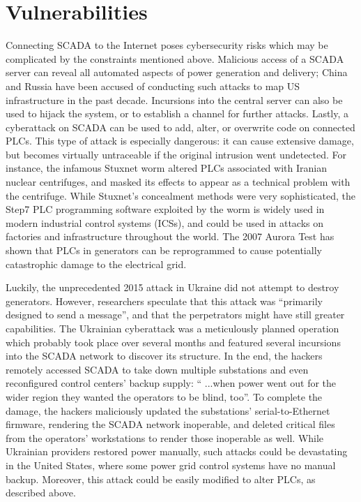 \documentclass[10pt]{article}
\begin{document}
    \section{Vulnerabilities}
    Connecting SCADA to the Internet poses cybersecurity risks which may be complicated by the constraints mentioned above. Malicious access of a SCADA server can reveal all automated aspects of power generation and delivery; China and Russia have been accused of conducting such attacks to map US infrastructure in the past decade.\cite{wsj} Incursions into the central server can also be used to hijack the system, or to establish a channel for further attacks.\cite{knapp26} Lastly, a cyberattack on SCADA can be used to add, alter, or overwrite code on connected PLCs. This type of attack is especially dangerous: it can cause extensive damage, but becomes virtually untraceable if the original intrusion went undetected. For instance, the infamous Stuxnet worm altered PLCs associated with Iranian nuclear centrifuges, and masked its effects to appear as a technical problem with the centrifuge.\cite{stuxnet} While Stuxnet's concealment methods were very sophisticated, the Step7 PLC programming software exploited by the worm is widely used in modern industrial control systems (ICSs), and could be used in attacks on factories and infrastructure throughout the world.\cite{stuxnet} The 2007 Aurora Test has shown that PLCs in generators can be reprogrammed to cause potentially catastrophic damage to the electrical grid.\cite{zeller}
    \medskip
    
    Luckily, the unprecedented 2015 attack in Ukraine did not attempt to destroy generators. However, researchers speculate that this attack was ``primarily designed to send a message'', and that the perpetrators might have still greater capabilities.\cite{wiredshort} The Ukrainian cyberattack was a meticulously planned operation which probably took place over several months and featured several incursions into the SCADA network to discover its structure. In the end, the hackers remotely accessed SCADA to take down multiple substations and even reconfigured control centers' backup supply: `` ...when power went out for the wider region they wanted the operators to be blind, too''.\cite{wiredshort} To complete the damage, the hackers maliciously updated the substations' serial-to-Ethernet firmware, rendering the SCADA network inoperable, and deleted critical files from the operators' workstations to render those inoperable as well.\cite{wiredshort} While Ukrainian providers restored power manually, such attacks could be devastating in the United States, where some power grid control systems have no manual backup.\cite{wiredshort} Moreover, this attack could be easily modified to alter PLCs, as described above.
    \medskip
    
\end{document}
